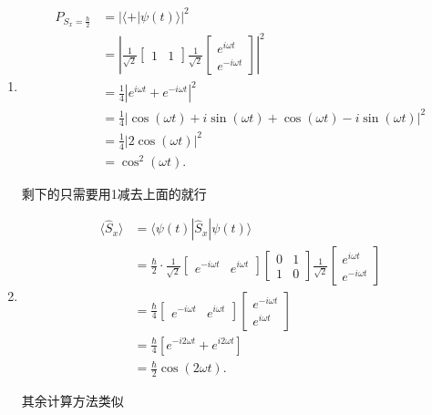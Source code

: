\documentclass[lang=cn,10pt]{elegantbook}
\begin{document}
\begin{solution}
\begin{enumerate}
		简洁起见，令 $\omega = \frac{\gamma B}{2}$,就可以化简了,即$\psi (t)=\frac{1}{\sqrt{2}}\left[ \begin{array}{c}
			e^{i\omega t}\\
			e^{-i\omega t}\\
		\end{array} \right] $
		
		\item \begin{align*}
			P_{S_x = \frac{\hbar}{2}} &= \left| \langle + | \psi(t) \rangle \right|^2 \\
			&= \left| \frac{1}{\sqrt{2}} \begin{bmatrix} 1 & 1 \end{bmatrix} \frac{1}{\sqrt{2}} \begin{bmatrix} e^{i\omega t} \\ e^{-i\omega t} \end{bmatrix} \right|^2 \\
			&= \frac{1}{4} \left| e^{i\omega t} + e^{-i\omega t} \right|^2 \\
			&= \frac{1}{4} \left| \cos(\omega t) + i\sin(\omega t) + \cos(\omega t) - i\sin(\omega t) \right|^2 \\
			&= \frac{1}{4} \left| 2\cos(\omega t) \right|^2 \\
			&= \cos^2(\omega t).
		\end{align*} 
		
		剩下的只需要用1减去上面的就行
		
		\item \begin{align*}
			\langle \hat{S}_x \rangle &= \langle \psi(t) | \hat{S}_x | \psi(t) \rangle \\
			&= \frac{\hbar}{2} \cdot \frac{1}{\sqrt{2}} \begin{bmatrix} e^{-i\omega t} & e^{i\omega t} \end{bmatrix} \begin{bmatrix} 0 & 1 \\ 1 & 0 \end{bmatrix} \frac{1}{\sqrt{2}} \begin{bmatrix} e^{i\omega t} \\ e^{-i\omega t} \end{bmatrix} \\
			&= \frac{\hbar}{4} \begin{bmatrix} e^{-i\omega t} & e^{i\omega t} \end{bmatrix} \begin{bmatrix} e^{-i\omega t} \\ e^{i\omega t} \end{bmatrix} \\
			&= \frac{\hbar}{4} \left[ e^{-i2\omega t} + e^{i2\omega t} \right] \\
			&= \frac{\hbar}{2} \cos(2\omega t).
		\end{align*}
		
		其余计算方法类似
	\end{enumerate}
\end{solution}
\end{document}
